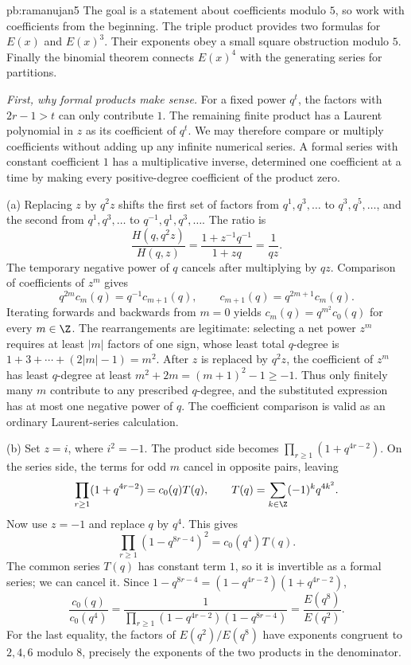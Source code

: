 \begin{solution}{pb:ramanujan5}
\idea The goal is a statement about coefficients modulo $5$,
so work with coefficients from the beginning. The triple product
provides two formulas for $E(x)$ and $E(x)^3$.
Their exponents obey a small square obstruction modulo $5$.
Finally the binomial theorem connects $E(x)^4$
with the generating series for partitions.

\writeup \emph{First, why formal products make sense.}
For a fixed power $q^t$, the factors with
$2r-1>t$ can only contribute $1$.
The remaining finite product has a Laurent polynomial
in $z$ as its coefficient of $q^t$.
We may therefore compare or multiply coefficients
without adding up any infinite numerical series.
A formal series with constant coefficient $1$ has a
multiplicative inverse, determined one coefficient
at a time by making every positive-degree coefficient
of the product zero.

(a) Replacing $z$ by $q^2z$ shifts the first set of
factors from $q^1,q^3,\ldots$ to $q^3,q^5,\ldots$,
and the second from $q^1,q^3,\ldots$ to
$q^{-1},q^1,q^3,\ldots$. The ratio is
\[
\frac{H(q,q^2z)}{H(q,z)}
=\frac{1+z^{-1}q^{-1}}{1+zq}
=\frac1{qz}.
\]
The temporary negative power of $q$ cancels
after multiplying by $qz$.
Comparison of coefficients of $z^m$ gives
\[
q^{2m}c_m(q)=q^{-1}c_{m+1}(q),
\qquad c_{m+1}(q)=q^{2m+1}c_m(q).
\]
Iterating forwards and backwards from $m=0$ yields
$c_m(q)=q^{m^2}c_0(q)$ for every $m\in\Z$.
The rearrangements are legitimate: selecting
a net power $z^m$ requires at least $|m|$
factors of one sign, whose least total $q$-degree
is $1+3+\cdots+(2|m|-1)=m^2$.
After $z$ is replaced by $q^2z$, the coefficient of
$z^m$ has least $q$-degree at least
$m^2+2m=(m+1)^2-1\ge-1$.
Thus only finitely many $m$ contribute to any prescribed
$q$-degree, and the substituted expression has at most one
negative power of $q$. The coefficient comparison is valid
as an ordinary Laurent-series calculation.

(b) Set $z=i$, where $i^2=-1$.
The product side becomes
$\prod_{r\ge1}(1+q^{4r-2})$.
On the series side, the terms for odd $m$
cancel in opposite pairs, leaving
\[
\prod_{r\ge1}(1+q^{4r-2})
=c_0(q)T(q),
\qquad
T(q)=\sum_{k\in\Z}(-1)^kq^{4k^2}.
\]
Now use $z=-1$ and replace $q$ by $q^4$.
This gives
\[
\prod_{r\ge1}(1-q^{8r-4})^2=c_0(q^4)T(q).
\]
The common series $T(q)$ has constant term $1$,
so it is invertible as a formal series; we can
cancel it. Since
$1-q^{8r-4}=(1-q^{4r-2})(1+q^{4r-2})$,
\[
\frac{c_0(q)}{c_0(q^4)}
=\frac1{\prod_{r\ge1}
(1-q^{4r-2})(1-q^{8r-4})}
=\frac{E(q^8)}{E(q^2)}.
\]
For the last equality, the factors of
$E(q^2)/E(q^8)$ have exponents congruent
to $2,4,6$ modulo $8$, precisely the
exponents of the two products in the denominator.


\end{solution}
